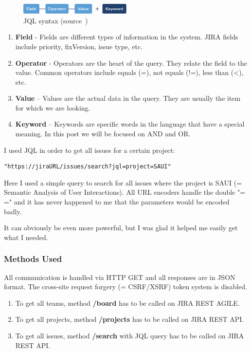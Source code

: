 \begin{figure}[!ht]
	\centering
	\includegraphics[width=0.5\textwidth]{figures/04_implementation/jql}
    \caption[JQL syntax]{JQL syntax (source~\protect\cite{jql})}
\end{figure}

\begin{enumerate}
	\item {\bf Field} - Fields are different types of information in the system. JIRA fields include priority, fixVersion, issue type, etc.
	\item {\bf Operator} - Operators are the heart of the query. They relate the field to the value. Common operators include equals (=), not equals (!=), less than (<), etc.
	\item {\bf Value} – Values are the actual data in the query. They are usually the item for which we are looking.
	\item {\bf Keyword} – Keywords are specific words in the language that have a special meaning. In this post we will be focused on AND and OR.
\end{enumerate}

I used JQL in order to get all issues for a certain project:

\begin{lstlisting}
"https://jiraURL/issues/search?jql=project=SAUI"
\end{lstlisting}

Here I used a simple query to search for all issues where the project is SAUI (= Semantic Analysis of User Interactions). All URL encoders handle the double "= =" and it has never happened to me that the parameters would be encoded badly.

It can obviously be even more powerful, but I was glad it helped me easily get what I needed.

\subsubsection{Methods Used}

All communication is handled via HTTP GET and all responses are in JSON format. The cross-site request forgery (= CSRF/XSRF) token system is disabled.

\begin{enumerate}
	\item To get all teams, method {\bf /board} has to be called on JIRA REST AGILE.
	\item To get all projects, method {\bf /projects} has to be called on JIRA REST API.
	\item To get all issues, method {\bf /search} with JQL query has to be called on JIRA REST API.
\end{enumerate}

